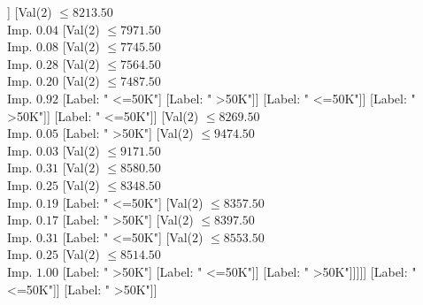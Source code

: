\documentclass[margin=10pt]{standalone}
\begin{document}
\begin{forest}
																															[Val($2$) $ \leq 7115.50$ \\ Imp. $0.92$
																																[Label: " <=50K"]
																																[Label: " >50K"]]
																															[Val($2$) $ \leq 8213.50$ \\ Imp. $0.04$
																																[Val($2$) $ \leq 7971.50$ \\ Imp. $0.08$
																																	[Val($2$) $ \leq 7745.50$ \\ Imp. $0.28$
																																		[Val($2$) $ \leq 7564.50$ \\ Imp. $0.20$
																																			[Val($2$) $ \leq 7487.50$ \\ Imp. $0.92$
																																				[Label: " <=50K"]
																																				[Label: " >50K"]]
																																			[Label: " <=50K"]]
																																		[Label: " >50K"]]
																																	[Label: " <=50K"]]
																																[Val($2$) $ \leq 8269.50$ \\ Imp. $0.05$
																																	[Label: " >50K"]
																																	[Val($2$) $ \leq 9474.50$ \\ Imp. $0.03$
																																		[Val($2$) $ \leq 9171.50$ \\ Imp. $0.31$
																																			[Val($2$) $ \leq 8580.50$ \\ Imp. $0.25$
																																				[Val($2$) $ \leq 8348.50$ \\ Imp. $0.19$
																																					[Label: " <=50K"]
																																					[Val($2$) $ \leq 8357.50$ \\ Imp. $0.17$
																																						[Label: " >50K"]
																																						[Val($2$) $ \leq 8397.50$ \\ Imp. $0.31$
																																							[Label: " <=50K"]
																																							[Val($2$) $ \leq 8553.50$ \\ Imp. $0.25$
																																								[Val($2$) $ \leq 8514.50$ \\ Imp. $1.00$
																																									[Label: " >50K"]
																																									[Label: " <=50K"]]
																																								[Label: " >50K"]]]]]
																																				[Label: " <=50K"]]
																																			[Label: " >50K"]]

\end{forest}
\end{document}
